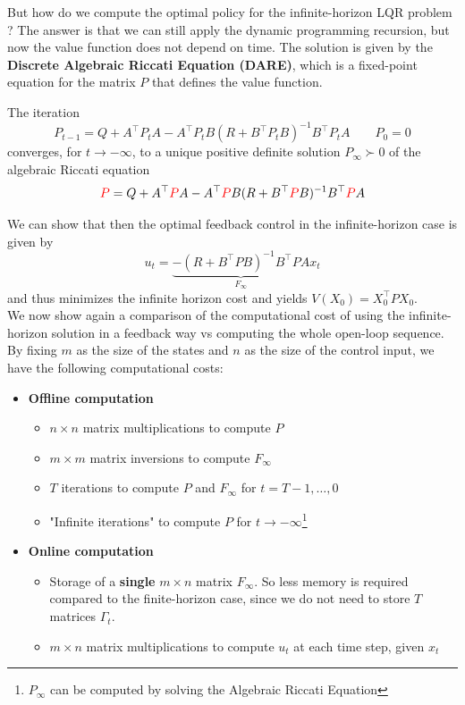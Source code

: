 But how do we compute the optimal policy for the infinite-horizon LQR problem ? The answer is that we can still apply the dynamic programming recursion, but now the value function does not depend on time. The solution is given by the \textbf{Discrete Algebraic Riccati Equation (DARE)}, which is a fixed-point equation for the matrix \(P\) that defines the value function.
\begin{theorembox}
The iteration 
$$P_{t-1} = Q + A^\top P_t A - A^\top P_t B (R + B^\top P_t B)^{-1} B^\top P_t A\qquad P_0 = 0$$
converges, for $t \to -\infty$, to a unique positive definite solution \(P_{\infty} \succ 0\) of the algebraic Riccati equation
$$ \textcolor{red}{P} = Q + A^\top \textcolor{red}{P} A - A^\top \textcolor{red}{P} B (R + B^\top \textcolor{red}{P} B)^{-1} B^\top \textcolor{red}{P} A $$
\end{theorembox}
We can show that then the optimal feedback control in the infinite-horizon case is given by
$$u_t = \underbrace{- (R + B^\top P B)^{-1} B^\top P A}_{F_{\infty}} x_t  $$
and thus minimizes the infinite horizon cost and yields $V(X_0) = X_0^\top P X_0$.\\
We now show again a comparison of the computational cost of using the infinite-horizon solution in a feedback way vs computing the whole open-loop sequence. By fixing $m$ as the size of the states and $n$ as the size of the control input, we have the following computational costs:
\begin{itemize}
    \item \textbf{Offline computation}
    \begin{itemize}
        \item $n\times n$ matrix multiplications to compute $P$
        \item $m\times m$ matrix inversions to compute $F_{\infty}$
        \item $T$ iterations to compute $P$ and $F_{\infty}$ for $t=T-1,\dots,0$
        \item "Infinite iterations" to compute $P$ for $t \to -\infty$\footnote{$P_{\infty}$ can be computed by solving the Algebraic Riccati Equation}
    \end{itemize}
    \item \textbf{Online computation}
    \begin{itemize}
        \item Storage of a \textbf{single} $m\times n$ matrix $F_{\infty}$. So less memory is required compared to the finite-horizon case, since we do not need to store $T$ matrices $\Gamma_t$.
        \item $m\times n$ matrix multiplications to compute $u_t$ at each time step, given $x_t$
    \end{itemize}
\end{itemize}

